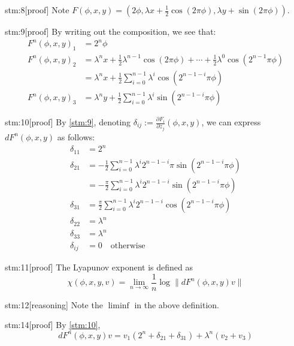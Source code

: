 \documentclass{article}
\begin{document}
\begin{stm}{stm:8}[proof]
Note $F(\phi, x, y) = (2\phi, \lambda x + \frac{1}{2} \cos(2\pi\phi), \lambda y + \sin(2\pi\phi))$.
\end{stm}

\begin{stm}{stm:9}[proof]
By writing out the composition, we see that:
\begin{align*}
F^n(\phi, x, y)_1 &= 2^n \phi \\
F^n(\phi, x, y)_2 &= \lambda^n x + \frac{1}{2} \lambda^{n-1} \cos(2\pi \phi) + \cdots + \frac{1}{2} \lambda^0 \cos(2^{n-1} \pi \phi) \\
&= \lambda^n x + \frac{1}{2} \sum_{i=0}^{n-1} \lambda^i \cos(2^{n-1-i} \pi \phi) \\
F^n(\phi, x, y)_3 &= \lambda^n y + \frac{1}{2} \sum_{i=0}^{n-1} \lambda^i \sin(2^{n-1-i} \pi \phi)
\end{align*}
\end{stm}


\begin{stm}{stm:10}[proof]
By \ref{stm:9}, denoting $\delta_{ij} := \frac{\partial F_i}{\partial z_j}(\phi, x, y)$, we can express $dF^n(\phi, x, y)$ as follows:
\begin{align*}
\delta_{11} &= 2^n \\
\delta_{21} &= -\frac{1}{2} \sum_{i=0}^{n-1} \lambda^i 2^{n-1-i} \pi \sin(2^{n-1-i} \pi \phi) \\
&= -\frac{\pi}{2} \sum_{i=0}^{n-1} \lambda^i 2^{n-1-i} \sin(2^{n-1-i} \pi \phi) \\
\delta_{31} &= \frac{\pi}{2} \sum_{i=0}^{n-1} \lambda^i 2^{n-1-i} \cos(2^{n-1-i} \pi \phi) \\
\delta_{22} &= \lambda^n \\
\delta_{33} &= \lambda^n \\
\delta_{ij} &= 0 \quad \text{otherwise}
\end{align*}
\end{stm}


\begin{stm}{stm:11}[proof]
The Lyapunov exponent is defined as
\[
\chi(\phi, x, y, v) = \lim_{n \to \infty} \frac{1}{n} \log \| dF^n(\phi, x, y)v \|
\]
\end{stm}

\begin{stm}{stm:12}[reasoning]
Note the $\liminf$ in the above definition.
\end{stm}

\begin{stm}{stm:14}[proof]
By \ref{stm:10},
\[
dF^n(\phi, x, y)v = v_1 (2^n + \delta_{21} + \delta_{31}) + \lambda^n (v_2 + v_3)
\]
\end{stm}
\end{document}
